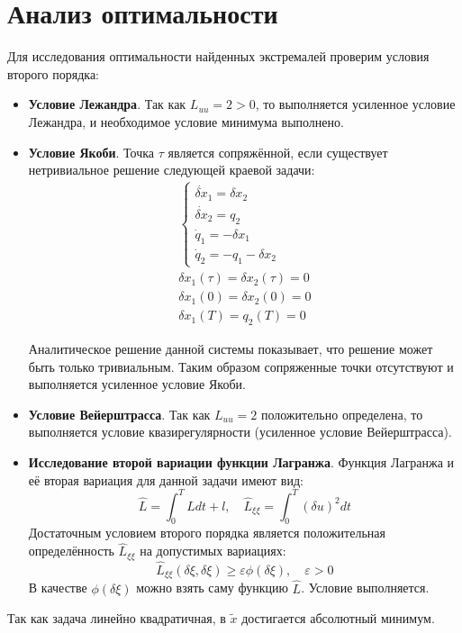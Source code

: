 \documentclass[a4paper,12pt]{article}
\begin{document}
\section*{Анализ оптимальности}
Для исследования оптимальности найденных экстремалей проверим условия второго порядка:
\begin{itemize}
  \item \textbf{Условие Лежандра}. Так как \(L_{uu}=2 > 0\), то выполняется усиленное условие Лежандра, и необходимое условие минимума выполнено.
  \item \textbf{Условие Якоби}. Точка \(\tau\) является сопряжённой, если существует нетривиальное решение следующей краевой задачи:
        \begin{gather*}
          \begin{cases}
            \dot{\delta x}_1=\delta x_2 \\
            \dot{\delta x}_2=q_2        \\
            \dot{q}_1=-\delta x_1       \\
            \dot{q}_2=-q_1 -\delta x_2
          \end{cases}\\
          \delta x_1(\tau)=\delta x_2(\tau)=0 \\
          \delta x_1(0) = \delta x_2(0)=0 \\
          \delta x_1(T) = q_2(T)=0
        \end{gather*}

        Аналитическое решение данной системы показывает, что решение может быть только тривиальным. Таким образом сопряженные точки отсутствуют и выполняется усиленное условие Якоби.
  \item \textbf{Условие Вейерштрасса}. Так как \(L_{uu}=2\) положительно определена, то выполняется условие квазирегулярности (усиленное условие Вейерштрасса).
  \item \textbf{Исследование второй вариации функции Лагранжа}. Функция Лагранжа и её вторая вариация для данной задачи имеют вид:
        \begin{equation*}
          \hat{L}=\int_0^TL dt+l,\quad \hat{L}_{\xi\xi}=\int_0^T(\delta u)^2 dt
        \end{equation*}
        Достаточным условием второго порядка является положительная определённость \(\hat{L}_{\xi\xi}\) на допустимых вариациях:
        \begin{equation*}
          \hat{L}_{\xi\xi}(\delta\xi,\delta\xi) \ge \varepsilon \phi(\delta\xi), \quad \varepsilon > 0
        \end{equation*}
        В качестве \(\phi(\delta\xi)\) можно взять саму функцию \(\hat{L}\). Условие выполняется.
\end{itemize}
Так как задача линейно квадратичная, в \(\tilde{x}\) достигается абсолютный минимум.
\end{document}

